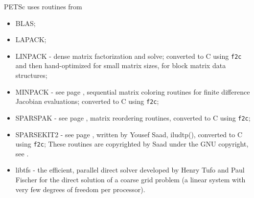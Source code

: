 \vspace{.3in}
\noindent
PETSc uses routines from 
\begin{itemize}
  \item BLAS;
  \item LAPACK;
  \item LINPACK -    dense matrix factorization and solve; converted to C using {\tt f2c} and then 
                     hand-optimized for small matrix sizes, for block matrix data structures;
  \item MINPACK -    see page \pageref{sec_fdmatrix}, sequential matrix coloring routines for finite difference Jacobian
                     evaluations; converted to C using {\tt f2c};
  \item SPARSPAK -   see page \pageref{sec_factorization}, matrix reordering routines, converted to C using {\tt f2c};
  \item SPARSEKIT2 - see page \pageref{sec_ilu_icc}, written by Yousef Saad, iludtp(), converted to C using {\tt f2c};
                     These routines 
                     are copyrighted by Saad under the GNU copyright, see .
  \item libtfs     - the efficient, parallel direct solver developed by Henry Tufo and Paul Fischer for the direct solution of a coarse grid problem (a linear system with very few degrees of freedom per processor).
\end{itemize}


